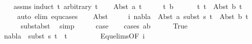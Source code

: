 \begin{isabellebody}
%
\isadelimproof
\ \ %
\endisadelimproof
%
\isatagproof
{}\isamarkupfalse%
\ assms\isanewline
{}\isamarkupfalse%
{\isacharparenleft}{\kern0pt}induct\ t{}\ arbitrary{\isacharcolon}{\kern0pt}\ t{}{\isacharparenright}{\kern0pt}\isanewline
\ \ \isamarkupfalse%
\ {\isacharparenleft}{\kern0pt}Abst\ a\ t{}{\isacharprime}{\kern0pt}{\isacharparenright}{\kern0pt}\isanewline
\ \ \isamarkupfalse%
\ \isamarkupfalse%
\ t{}{\isacharprime}{\kern0pt}\ b\ \isanewline
\ \ \ \ \ t{}{\isacharcolon}{\kern0pt}\ {\isachardoublequoteopen}t{}\ {\isacharequal}{\kern0pt}\ Abst\ b\ t{}{\isacharprime}{\kern0pt}{\isachardoublequoteclose}\isanewline
\ \ \ \ \isamarkupfalse%
{\isacharparenleft}{\kern0pt}auto\ elim{\isacharcolon}{\kern0pt}\ equ{\isachardot}{\kern0pt}cases{\isacharparenright}{\kern0pt}\isanewline
\ \ \isamarkupfalse%
\ Abst{\isacharparenleft}{\kern0pt}{}{\isacharparenright}{\kern0pt}\ \isamarkupfalse%
\isanewline
\ \ \ \ i{\isacharcolon}{\kern0pt}\ {\isachardoublequoteopen}nabla\ {\isasymturnstile}\ Abst\ a\ {\isacharparenleft}{\kern0pt}subst\ s{}\ t{}{\isacharprime}{\kern0pt}{\isacharparenright}{\kern0pt}\ {\isasymapprox}\ Abst\ b\ t{}{\isacharprime}{\kern0pt}{\isachardoublequoteclose}\isanewline
\ \ \ \ \isamarkupfalse%
\ subst{\isacharunderscore}{\kern0pt}abst\ \isamarkupfalse%
\ simp\isanewline
\ \ \isamarkupfalse%
\ \isamarkupfalse%
\ {\isacharquery}{\kern0pt}case\ \isanewline
\ \ \isamarkupfalse%
{\isacharparenleft}{\kern0pt}cases\ {\isachardoublequoteopen}a{\isacharequal}{\kern0pt}b{\isachardoublequoteclose}{\isacharparenright}{\kern0pt}\isanewline
\ \ \ \ \isamarkupfalse%
\ True\isanewline
\ \ \ \ \isamarkupfalse%
\ {\isachardoublequoteopen}nabla\ {\isasymturnstile}\ {\isacharparenleft}{\kern0pt}subst\ s{}\ t{}{\isacharprime}{\kern0pt}{\isacharparenright}{\kern0pt}\ {\isasymapprox}\ t{}{\isacharprime}{\kern0pt}{\isachardoublequoteclose}\ \isanewline
\ \ \ \ \ \ \isamarkupfalse%
\ Equ{\isacharunderscore}{\kern0pt}elims{\isacharparenleft}{\kern0pt}{}{\isacharparenright}{\kern0pt}{\isacharbrackleft}{\kern0pt}OF\ i{\isacharbrackright}{\kern0pt}\ \isamarkupfalse%

\end{isabellebody}
